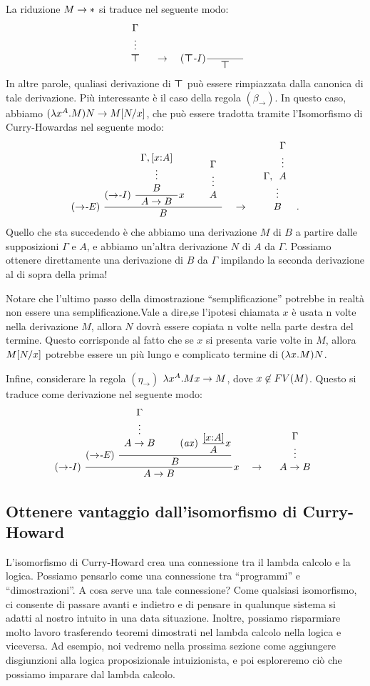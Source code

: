 \documentclass{article}
\begin{document}
La riduzione $M\to{*}$ si traduce nel seguente modo:
\[
\ideriv{\Gamma}{\ctrue} \ssep\to\ssep \trule{$\ctrue$-I}\deriv{\hspace{.5in}}{\ctrue}
\]
In altre parole, qualiasi derivazione di $\textrm{\rm\boldmath $\top$}$ pu\`o essere rimpiazzata dalla canonica di tale derivazione.
Pi\`u interessante \`e il caso della regola $(\beta_{\to})$. In questo caso, abbiamo
$(\lambda x^{A}.M)N \to M[N/x]$, che pu\`o essere tradotta tramite
  l'Isomorfismo di Curry-Howardas nel seguente modo:
\[
\trule{$\to$-E}\ \deriv{\trule{$\to$-I}\ 
  \deriv{\ideriv{\Gamma,[\typ{x}{A}]}{B}}{A\to B} x
  \sep\ideriv{\Gamma}{A}}{B}
\ssep\to \ssep 
\ideriv{\Gamma,\ideriv{\Gamma}{A}}{B}.
\]
Quello che sta succedendo \`e che abbiamo una derivazione $M$ di $B$ a partire
dalle supposizioni $\Gamma$ e $A$, e abbiamo un'altra derivazione $N$ di
$A$ da $\Gamma$. Possiamo ottenere direttamente una derivazione di $B$ da
$\Gamma$ impilando la seconda derivazione al di sopra della prima!

Notare che l'ultimo passo della dimostrazione ``semplificazione''  potrebbe in realt\`a 
non essere una semplificazione.Vale a dire,se l'ipotesi chiamata $x$ \`e usata
n volte nella derivazione $M$, allora $N$ dovr\`a essere copiata n volte
nella parte destra del termine. Questo corrisponde al fatto che se
$x$ si presenta varie volte in $M$, allora $M[N/x]$ potrebbe essere
un pi\`u lungo e complicato termine di $(\lambda x.M)N$.

Infine, considerare la regola $(\eta_{\to})$  $\lambda x^{A}.Mx \to M$,
dove $x\not\in FV(M)$. Questo si traduce come derivazione nel seguente modo:
\[
\trule{$\to$-I}\ \deriv{\trule{$\to$-E}\ \deriv{\ideriv{\Gamma}{A\to
      B}\sep\trule{ax}\ \deriv{[\typ{x}{A}]}{A} x}{B}}{A\to B} x
\ssep\to\ssep \ideriv{\Gamma}{A\to B}
\]

\subsection{Ottenere vantaggio dall'isomorfismo di Curry-Howard}

L'isomorfismo di Curry-Howard crea una connessione tra il lambda
calcolo e la logica. Possiamo pensarlo come una connessione tra
``programmi'' e ``dimostrazioni''. A cosa serve una tale connessione? Come qualsiasi
isomorfismo,  ci consente di passare avanti e indietro e di pensare in
qualunque sistema si adatti al nostro intuito in una data situazione.  Inoltre,
possiamo risparmiare molto lavoro trasferendo teoremi dimostrati
nel lambda calcolo nella logica e viceversa. Ad esempio, noi
vedremo nella prossima sezione come aggiungere disgiunzioni alla logica proposizionale
intuizionista, e poi esploreremo ci\`o che possiamo imparare
dal lambda calcolo.
\end{document}
